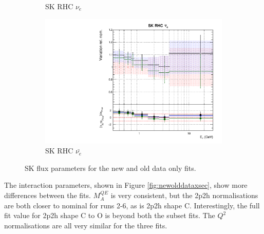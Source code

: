 \begin{figure}
\begin{subfigure}{0.45\textwidth}
  \caption{SK RHC $\nu_{e}$}
\end{subfigure}
\begin{subfigure}{0.45\textwidth}
  \centering
  \includegraphics[width=0.75\linewidth]{figs/newolddatafitsflux_15}
  \caption{SK RHC $\bar{\nu_e}$}
\end{subfigure}
\caption{SK flux parameters for the new and old data only fits.}
\label{fig:newolddatafluxSK}
\end{figure}

The interaction parameters, shown in Figure \ref{fig:newolddataxsec}, show more differences between the fits. $M_{A}^{QE}$ is very consistent, but the 2p2h normalisations are both closer to nominal for runs 2-6, as is 2p2h shape C. Interestingly, the full fit value for 2p2h shape C to O is beyond both the subset fits. The $Q^2$ normalisations are all very similar for the three fits.

